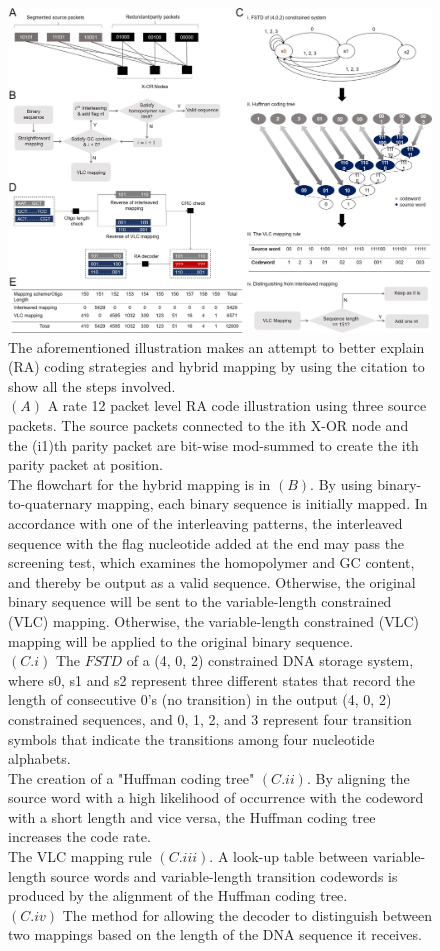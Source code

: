 \documentclass[10pt,twocolumn,twoside]{gsajnl}
\theoremstyle{definition}
\begin{document}
\begin{figure}[htbp]
\centering
\includegraphics[width=\linewidth]{figure hybrid mapping.jpg}
\caption{The aforementioned illustration makes an attempt to better explain (RA) coding strategies and hybrid mapping by using the citation \cite{wang2019high} to show all the steps involved.\\
$(A)$ A rate 12 packet level RA code illustration using three source packets. The source packets connected to the ith X-OR node and the (i1)th parity packet are bit-wise mod-summed to create the ith parity packet at position.\\
The flowchart for the hybrid mapping is in $(B)$. By using binary-to-quaternary mapping, each binary sequence is initially mapped. In accordance with one of the interleaving patterns, the interleaved sequence with the flag nucleotide added at the end may pass the screening test, which examines the homopolymer and GC content, and thereby be output as a valid sequence. Otherwise, the original binary sequence will be sent to the variable-length constrained (VLC) mapping.
Otherwise, the variable-length constrained (VLC) mapping will be applied to the original binary sequence.
\\$(C.i)$ The $FSTD$ of a (4, 0, 2) constrained DNA storage system, where s0, s1 and s2 represent three different states that record the length of consecutive 0's (no transition) in the output (4, 0, 2) constrained sequences, and 0, 1, 2, and 3 represent four transition symbols that indicate the transitions among four nucleotide alphabets.\\
The creation of a "Huffman coding tree" $(C. ii)$. By aligning the source word with a high likelihood of occurrence with the codeword with a short length and vice versa, the Huffman coding tree increases the code rate. \\The VLC mapping rule $(C. iii)$. A look-up table between variable-length source words and variable-length transition codewords is produced by the alignment of the Huffman coding tree. \\$(C. iv)$ The method for allowing the decoder to distinguish between two mappings based on the length of the DNA sequence it receives.
}
\end{figure}
\end{document}
